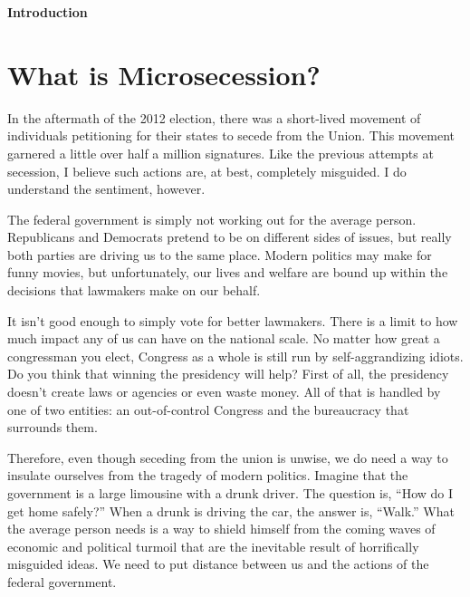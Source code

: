
\clearpage\setcounter{page}{1}\pagestyle{Standard}
{\centering{}\bfseries\color{black}
Introduction
\par}


\bigskip

\section{What is Microsecession?}

\bigskip

{\color{black}
In the aftermath of the 2012 election, there was a short-lived movement
of individuals petitioning for their states to secede from the
Union\textcolor[rgb]{0.32941177,0.5529412,0.83137256}{. This movement
garnered} a little over half a million signatures. Like the previous
attempts at secession, I believe such actions are, at best, completely
misguided. I do understand the
sentiment\textcolor[rgb]{0.32941177,0.5529412,0.83137256}{, however}. }

{\color{black}
The federal government is simply not working out for the average person.
Republicans and Democrats pretend to be on different sides of issues,
but really \textcolor[rgb]{0.32941177,0.5529412,0.83137256}{both
parties are} driving us to the same place. Modern politics
\textcolor[rgb]{0.32941177,0.5529412,0.83137256}{may make} for funny
movies, but unfortunately, our lives and welfare are bound up within
the decisions that lawmakers make on our behalf.}

{\color{black}
It isn’t good enough to simply vote for better lawmakers. There is a
limit to how much impact any of us can have on the national scale. No
matter how great a congressman you elect, Congress as a whole is still
run by self-aggrandizing idiots. Do you think that winning the
presidency will help?  First of all, the presidency doesn’t create laws
or agencies or even waste money. All of that is handled by one of two
entities: an out-of-control Congress and the bureaucracy that surrounds
them.}

{\color{black}
Therefore, even though seceding from the union is unwise, we do need a
way to insulate ourselves from the tragedy of modern politics. Imagine
that the government is a large limousine with a drunk driver. The
question is, “How do I get home safely?”  When a drunk is driving the
car, the answer is, “Walk.”  What the average person needs is a way to
shield himself from the coming waves of economic and political turmoil
that are the inevitable result of horrifically misguided ideas. We need
to put distance between us and the actions of the federal government. }

